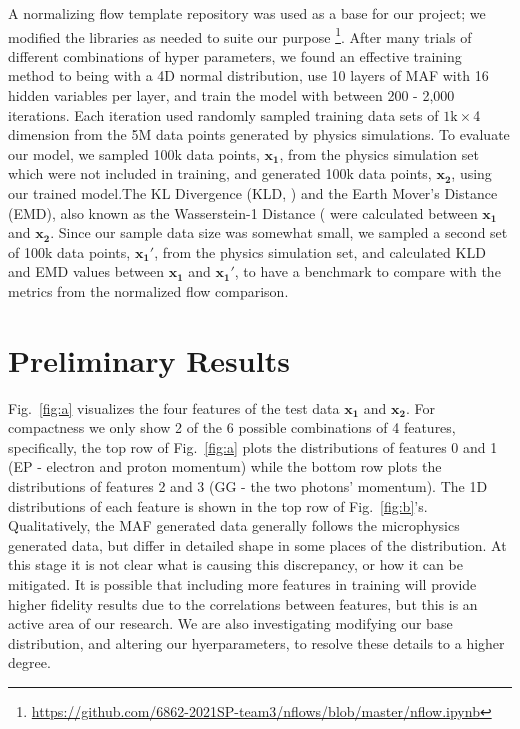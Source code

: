 A normalizing flow template repository was used as a base for our project; we modified the libraries as needed to suite our purpose \footnote{\url{https://github.com/6862-2021SP-team3/nflows/blob/master/nflow.ipynb}}. After many trials of different combinations of hyper parameters, we found an effective training method to being with a 4D normal distribution, use 10 layers of MAF with 16 hidden variables per layer, and train the model with between 200 - 2,000 iterations. Each iteration used randomly sampled training data sets of $1\text{k}\times$4 dimension from the 5M data points generated by physics simulations. To evaluate our model, we sampled 100k data points, $\mathbf{x_1}$, from the physics simulation set which were not included in training, and generated 100k data points, $\mathbf{x_2}$, using our trained model.The KL Divergence (KLD, \citet{Kullback51klDivergence}) and the Earth Mover's Distance (EMD), also known as the Wasserstein-1 Distance (\citet{Dobrushin} were calculated between $\mathbf{x_1}$ and $\mathbf{x_2}$. Since our sample data size was somewhat small, we sampled a second set of 100k data points, $\mathbf{x_1'}$, from the physics simulation set, and calculated KLD and EMD values between  $\mathbf{x_1}$ and $\mathbf{x_1'}$, to have a benchmark to compare with the metrics from the normalized flow comparison.

\section{Preliminary Results}
Fig.~\ref{fig:a} visualizes the four features of the test data $\mathbf{x_1}$ and $\mathbf{x_2}$. For compactness we only show 2 of the 6 possible combinations of 4 features, specifically, the top row of  Fig.~\ref{fig:a} plots the distributions of features 0 and 1 (EP - electron and proton momentum) while the bottom row plots the distributions of features 2 and 3 (GG - the two photons' momentum). The 1D distributions of each feature is shown in the top row of Fig.~\ref{fig:b}'s. Qualitatively, the MAF generated data generally follows the microphysics generated data, but differ in detailed shape in some places of the distribution. At this stage it is not clear what is causing this discrepancy, or how it can be mitigated. It is possible that including more features in training will provide higher fidelity results due to the correlations between features, but this is an active area of our research. We are also investigating modifying our base distribution, and altering our hyerparameters, to resolve these details to a higher degree.

